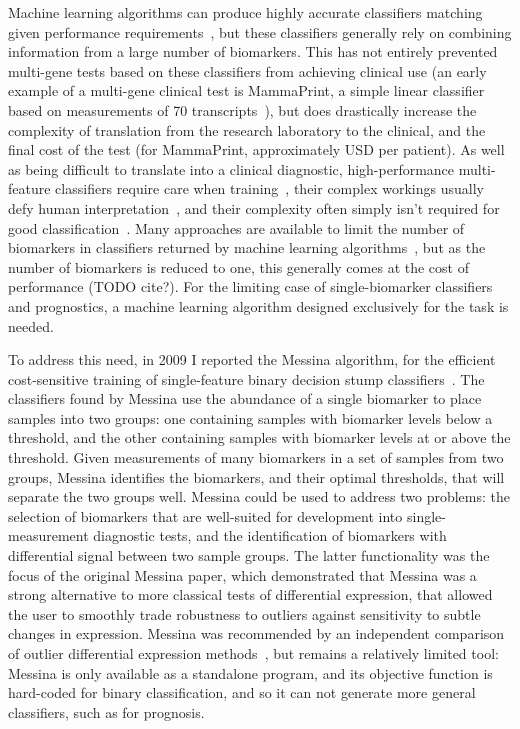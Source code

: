 \documentclass[dissertation.tex]{subfiles}
\begin{document}
Machine learning algorithms can produce highly accurate classifiers matching given performance requirements~\cite{Bach2006}, but these classifiers generally rely on combining information from a large number of biomarkers.  This has not entirely prevented multi-gene tests based on these classifiers from achieving clinical use (an early example of a multi-gene clinical test is MammaPrint\texttrademark, a simple linear classifier based on measurements of 70 transcripts~\cite{Veer2002}), but does drastically increase the complexity of translation from the research laboratory to the clinical, and the final cost of the test (for MammaPrint, approximately  USD per patient).  As well as being difficult to translate into a clinical diagnostic, high-performance multi-feature classifiers require care when training~\cite{Aliferis2009}, their complex workings usually defy human interpretation~\cite{Breiman2001b}, and their complexity often simply isn't required for good classification~\cite{Grate2005}.  Many approaches are available to limit the number of biomarkers in classifiers returned by machine learning algorithms~\cite{Guyon2003}, but as the number of biomarkers is reduced to one, this generally comes at the cost of performance (TODO cite?).  For the limiting case of single-biomarker classifiers and prognostics, a machine learning algorithm designed exclusively for the task is needed.

To address this need, in 2009 I reported the Messina algorithm, for the efficient cost-sensitive training of single-feature binary decision stump classifiers~\cite{Pinese2009}.  The classifiers found by Messina use the abundance of a single biomarker to place samples into two groups: one containing samples with biomarker levels below a threshold, and the other containing samples with biomarker levels at or above the threshold.  Given measurements of many biomarkers in a set of samples from two groups, Messina identifies the biomarkers, and their optimal thresholds, that will separate the two groups well.  Messina could be used to address two problems: the selection of biomarkers that are well-suited for development into single-measurement diagnostic tests, and the identification of biomarkers with differential signal between two sample groups.  The latter functionality was the focus of the original Messina paper, which demonstrated that Messina was a strong alternative to more classical tests of differential expression, that allowed the user to smoothly trade robustness to outliers against sensitivity to subtle changes in expression.  Messina was recommended by an independent comparison of outlier differential expression methods~\cite{Karrila2011}, but remains a relatively limited tool: Messina is only available as a standalone program, and its objective function is hard-coded for binary classification, and so it can not generate more general classifiers, such as for prognosis.
\end{document}
